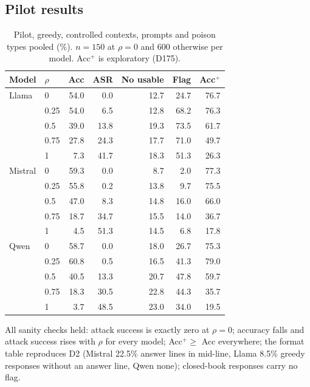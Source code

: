 \documentclass[11pt,a4paper]{report}
\begin{document}
\subsection{Pilot results}
\begin{table}[h]
\centering
\small
\begin{tabular}{llrrrrr}
\hline
Model & $\rho$ & Acc & ASR & No usable & Flag & Acc$^{+}$ \\
\hline
Llama   & 0    & 54.0 &  0.0 & 12.7 & 24.7 & 76.7 \\
        & 0.25 & 54.0 &  6.5 & 12.8 & 68.2 & 76.3 \\
        & 0.5  & 39.0 & 13.8 & 19.3 & 73.5 & 61.7 \\
        & 0.75 & 27.8 & 24.3 & 17.7 & 71.0 & 49.7 \\
        & 1    &  7.3 & 41.7 & 18.3 & 51.3 & 26.3 \\
Mistral & 0    & 59.3 &  0.0 &  8.7 &  2.0 & 77.3 \\
        & 0.25 & 55.8 &  0.2 & 13.8 &  9.7 & 75.5 \\
        & 0.5  & 47.0 &  8.3 & 14.8 & 16.0 & 66.0 \\
        & 0.75 & 18.7 & 34.7 & 15.5 & 14.0 & 36.7 \\
        & 1    &  4.5 & 51.3 & 14.5 &  6.8 & 17.8 \\
Qwen    & 0    & 58.7 &  0.0 & 18.0 & 26.7 & 75.3 \\
        & 0.25 & 60.8 &  0.5 & 16.5 & 41.3 & 79.0 \\
        & 0.5  & 40.5 & 13.3 & 20.7 & 47.8 & 59.7 \\
        & 0.75 & 18.3 & 30.5 & 22.8 & 44.3 & 35.7 \\
        & 1    &  3.7 & 48.5 & 23.0 & 34.0 & 19.5 \\
\hline
\end{tabular}
\caption{Pilot, greedy, controlled contexts, prompts and poison types pooled
(\%). $n=150$ at $\rho=0$ and $600$ otherwise per model. Acc$^{+}$ is
exploratory (D175).}
\end{table}

All sanity checks held: attack success is exactly zero at $\rho=0$; accuracy
falls and attack success rises with $\rho$ for every model; Acc$^{+}\ge$ Acc
everywhere; the format table reproduces D2 (Mistral 22.5\% answer lines in
mid-line, Llama 8.5\% greedy responses without an answer line, Qwen none);
closed-book responses carry no flag.
\end{document}
